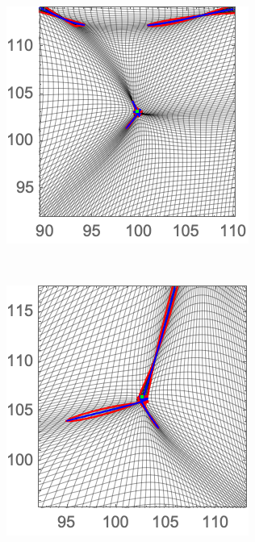 \documentclass[a4paper, 11pt]{article}
\begin{document}
\begin{figure}
\begin{subfigure}[b]{0.24\textwidth}
\end{subfigure}~
\begin{subfigure}[b]{0.24\textwidth}
\includegraphics[width=\textwidth]{Elliptic_Nb_Zoom}
\end{subfigure}~
\begin{subfigure}[b]{0.24\textwidth}
\includegraphics[width=\textwidth]{Hyperbolic_Nb_Zoom}

\end{subfigure}
\end{figure}
\end{document}
